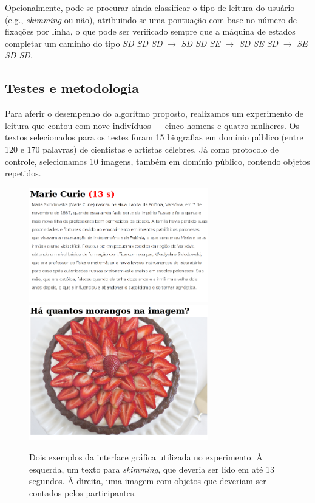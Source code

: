 \documentclass[12pt]{article}
\begin{document}
		Opcionalmente, pode-se procurar ainda classificar o tipo de leitura do usuário (e.g., \textit{skimming} ou não), atribuindo-se uma pontuação com base no número de fixações por linha, o que pode ser verificado sempre que a máquina de estados completar um caminho do tipo \textit{SD SD SD} $\rightarrow$ \textit{SD SD SE} $\rightarrow$ \textit{SD SE SD} $\rightarrow$ \textit{SE SD SD}.
	
		
		
		\subsection{Testes e metodologia}
		Para aferir o desempenho do algoritmo proposto, realizamos um experimento de leitura que contou com nove indivíduos --- cinco homens e quatro mulheres. Os textos selecionados para os testes foram 15 biografias em domínio público (entre 120 e 170 palavras) de cientistas e artistas célebres. Já como protocolo de controle, selecionamos 10 imagens, também em domínio público, contendo objetos repetidos.
		
		\begin{figure}[!ht]
			\centering
			\includegraphics[width=7.8cm]{imgs/experimento1.png}
			\includegraphics[width=7.8cm]{imgs/experimento2.png}
			\caption{\footnotesize {Dois exemplos da interface gráfica utilizada no experimento. À esquerda, um texto para \textit{skimming}, que deveria ser lido em até 13 segundos. À direita, uma imagem com objetos que deveriam ser contados pelos participantes.}}
			\label{fig:experimento}
			\vspace{5mm}
		\end{figure}
		
\end{document}

